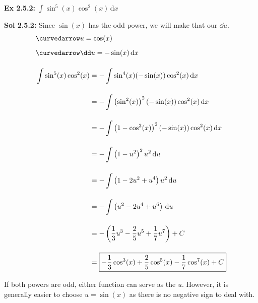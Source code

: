 \begin{tcolorbox}[example]
    \textbf{Ex 2.5.2: } $\int \sin^5 (x)\cos^2 (x) \,\mathrm{d}x$
\end{tcolorbox}
\begin{tcolorbox}[solution]
    \textbf{Sol 2.5.2: } Since $\sin (x)$ has the odd power, we will make that our $\dd u$. \begin{align*}
        & \curvedarrow u = \cos (x) \\[5.5pt]
        & \curvedarrow \dd u = -\sin (x) \,\mathrm{d}x \\[11pt]
        & \int \sin^5 (x)\cos^2 (x) \begin{aligned}[t]
            & = -\int \sin^4 (x)(-\sin (x))\cos^2 (x) \,\mathrm{d}x \\[11pt]
            & = -\int \left(\sin^2 (x)\right)^2(-\sin (x))\cos^2 (x) \,\mathrm{d}x \\[11pt]
            & = -\int \left(1 - \cos^2 (x)\right)^2(-\sin (x))\cos^2 (x) \,\mathrm{d}x \\[11pt]
            & = -\int \left(1 - u^2\right)^2u^2 \,\mathrm{d}u \\[11pt]
            & = -\int \left(1 - 2u^2 + u^4\right)u^2 \,\mathrm{d}u \\[11pt]
            & = -\int \left(u^2 - 2u^4 + u^6\right) \,\mathrm{d}u \\[11pt]
            & = -\left(\dfrac{1}{3}u^3 - \dfrac{2}{5}u^5 + \dfrac{1}{7}u^7\right) + C \\[11pt]
            & = \boxed{-\dfrac{1}{3}\cos^3 (x) + \dfrac{2}{5}\cos^5 (x) - \dfrac{1}{7}\cos^7 (x) + C}
        \end{aligned}
    \end{align*}
\end{tcolorbox}

If both powers are odd, either function can serve as the $u$. However, it is generally easier to choose $u = \sin (x)$ as there is no negative sign to deal with. \par 

